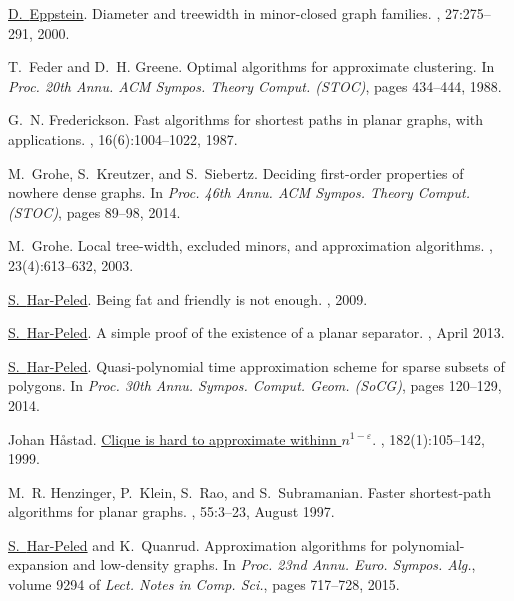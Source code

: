 \documentclass[12pt]{article}
\theoremstyle{remark}\theoremheaderfont{\sf}\theorembodyfont{\upshape}
\numberwithin{figure}{section}\numberwithin{table}{section}\numberwithin{equation}{section}
\begin{document}
{\begin{thebibliography}{vdSOdBV98}
\href{http://www.ics.uci.edu/~eppstein/}{D.~{Eppstein}}.
\newblock  Diameter and treewidth in minor-closed graph families.
, 27:275--291, 2000.

T.~Feder and D.~H. Greene.
\newblock  Optimal algorithms for approximate clustering.
\newblock In {\em Proc. 20th Annu. ACM Sympos. Theory Comput. {\em(STOC)}},
  pages 434--444, 1988.

G.~N. Frederickson.
\newblock  Fast algorithms for shortest paths in planar graphs, with
  applications.
, 16(6):1004--1022, 1987.

M.~Grohe, S.~Kreutzer, and S.~Siebertz.
\newblock  Deciding first-order properties of nowhere dense graphs.
\newblock In {\em Proc. 46th Annu. ACM Sympos. Theory Comput. {\em(STOC)}},
  pages 89--98, 2014.

M.~Grohe.
\newblock  Local tree-width, excluded minors, and approximation algorithms.
, 23(4):613--632, 2003.

\href{http://sarielhp.org}{S.~{{Har-Peled}}}.
\newblock  Being fat and friendly is not enough.
, 2009.

\href{http://sarielhp.org}{S.~{{Har-Peled}}}.
\newblock  A simple proof of the existence of a planar separator.
, April 2013.

\href{http://sarielhp.org}{S.~{{Har-Peled}}}.
\newblock  Quasi-polynomial time approximation scheme for sparse subsets of
  polygons.
\newblock In {\em Proc. 30th Annu. Sympos. Comput. Geom. {\em(SoCG)}}, pages
  120--129, 2014.

Johan H{\aa}stad.
\newblock \href{http://dx.doi.org/10.1007/BF02392825}{Clique is hard to
  approximate withinn {$n^{1-\varepsilon}$}}.
, 182(1):105--142, 1999.

M.~R. Henzinger, P.~Klein, S.~Rao, and S.~Subramanian.
\newblock  Faster shortest-path algorithms for planar graphs.
, 55:3--23, August 1997.

\href{http://sarielhp.org}{S.~{{Har-Peled}}} and K.~Quanrud.
\newblock  Approximation algorithms for polynomial-expansion and low-density
  graphs.
\newblock In {\em Proc. 23nd Annu. Euro. Sympos. Alg.\CNFESA}, volume 9294 of
  {\em Lect. Notes in Comp. Sci.}, pages 717--728, 2015.


\end{thebibliography}}
\end{document}
